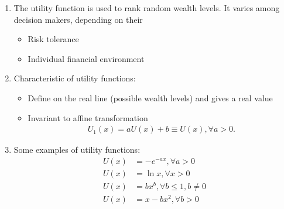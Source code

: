 \documentclass[12pt,twoside]{article}
\begin{document}
\begin{enumerate}
\item The utility function is used to rank random wealth levels. It varies among decision makers, depending on their
	\begin{itemize}
		\item Risk tolerance
		\item Individual financial environment
	\end{itemize}

\item Characteristic of utility functions:
	\begin{itemize}
		\item Define on the real line (possible wealth levels) and gives a real value
		\item Invariant to affine transformation
			\begin{align*}
				U_1(x) = aU(x) + b \equiv U(x), \forall a>0.
			\end{align*}				
	\end{itemize}

\item Some examples of utility functions:
	\begin{align*}
		U(x) & = - e^{-ax}, \forall a>0\\
		U(x) & = \ln x, \forall x>0\\
		U(x) & = bx^b, \forall b\leq 1, b\neq 0\\
		U(x) & = x - bx^2, \forall b>0
	\end{align*}
	
\end{enumerate}
\end{document}
